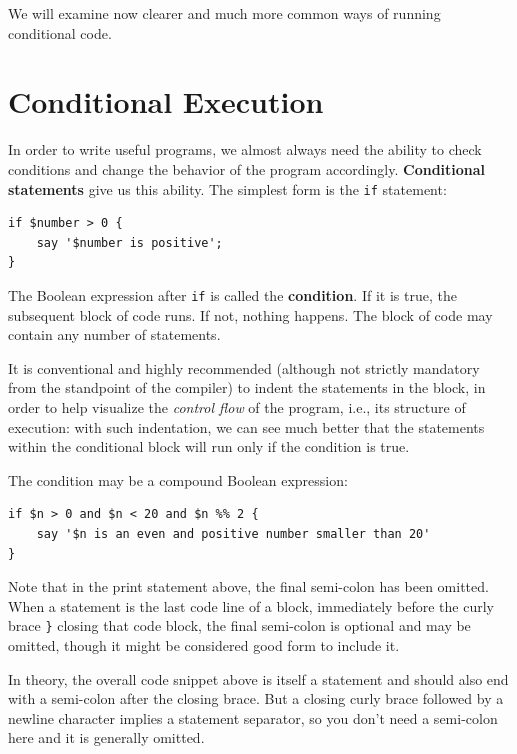 We will examine now clearer and much more common 
ways of running conditional code.


\section{Conditional Execution}
\label{conditional.execution}

In order to write useful programs, we almost always need the ability
to check conditions and change the behavior of the program
accordingly.  {\bf Conditional statements} give us this ability.  The
simplest form is the {\tt if} statement:

\begin{verbatim}
if $number > 0 {
    say '$number is positive';
}
\end{verbatim}
%
The Boolean expression after {\tt if} is called the 
{\bf condition}.  If it is true, the subsequent 
block of code runs.  If not, nothing happens. The block of 
code may contain any number of statements.

It is conventional and highly recommended (although not 
strictly mandatory from the standpoint of the compiler) 
to indent the statements in the block, in order to help 
visualize the \emph{control flow} of the program, i.e., 
its structure of execution: with such indentation, we 
can see much better that the statements within the 
conditional block will run only if the condition is true.

The condition may be a compound Boolean expression:
\begin{verbatim}
if $n > 0 and $n < 20 and $n %% 2 {
    say '$n is an even and positive number smaller than 20'
}
\end{verbatim}
%
Note that in the print statement above, the final semi-colon 
has been omitted. When a statement is the last code line of 
a block, immediately before the curly brace {\tt \}} closing 
that code block, the final semi-colon is optional and may 
be omitted, though it might be considered good form to include it.

In theory, the overall code snippet above is itself a statement 
and should also end with a semi-colon after the closing brace. 
But a closing curly brace followed by a newline character implies a statement separator, so you don't need a semi-colon here and it is generally omitted.




